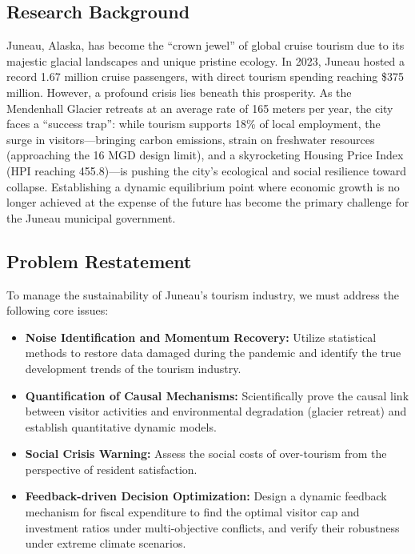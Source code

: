 \documentclass{mcmthesis}
\begin{document}
\subsection{Research Background}
Juneau, Alaska, has become the ``crown jewel'' of global cruise tourism due to its majestic glacial landscapes and unique pristine ecology. In 2023, Juneau hosted a record 1.67 million cruise passengers, with direct tourism spending reaching \$375 million. However, a profound crisis lies beneath this prosperity. As the Mendenhall Glacier retreats at an average rate of 165 meters per year, the city faces a ``success trap'': while tourism supports 18\% of local employment, the surge in visitors---bringing carbon emissions, strain on freshwater resources (approaching the 16 MGD design limit), and a skyrocketing Housing Price Index (HPI reaching 455.8)---is pushing the city's ecological and social resilience toward collapse. Establishing a dynamic equilibrium point where economic growth is no longer achieved at the expense of the future has become the primary challenge for the Juneau municipal government.

\subsection{Problem Restatement}
To manage the sustainability of Juneau's tourism industry, we must address the following core issues:

\begin{itemize}
    \item \textbf{Noise Identification and Momentum Recovery:} Utilize statistical methods to restore data damaged during the pandemic and identify the true development trends of the tourism industry.
    \item \textbf{Quantification of Causal Mechanisms:} Scientifically prove the causal link between visitor activities and environmental degradation (glacier retreat) and establish quantitative dynamic models.
    \item \textbf{Social Crisis Warning:} Assess the social costs of over-tourism from the perspective of resident satisfaction.
    \item \textbf{Feedback-driven Decision Optimization:} Design a dynamic feedback mechanism for fiscal expenditure to find the optimal visitor cap and investment ratios under multi-objective conflicts, and verify their robustness under extreme climate scenarios.
\end{itemize}
\end{document}
